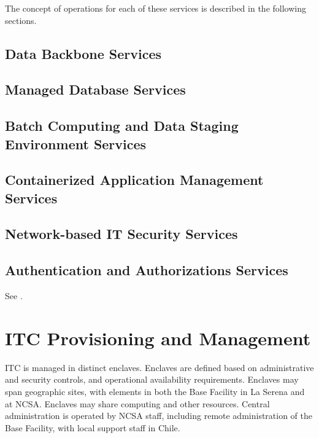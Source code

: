 The concept of operations for each of these services is described in the
following sections.

\subsection{Data Backbone Services}
\label{sect:dbb-services}


\subsection{Managed Database Services}


\subsection{Batch Computing and Data Staging Environment Services}


\subsection{Containerized Application Management Services}


\subsection{Network-based IT Security Services}


\subsection{Authentication and Authorizations Services}
See .

\section{ITC Provisioning and Management}

ITC is managed in distinct enclaves. Enclaves are defined based on administrative
and security controls, and operational availability requirements. Enclaves may
span geographic sites, with elements in both the Base Facility in La Serena and
at NCSA. Enclaves may share computing and other resources.
Central administration is operated by NCSA staff, including remote administration of the Base Facility,
with local support staff in Chile.

